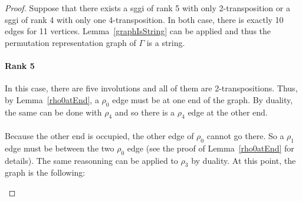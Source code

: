 \begin{proof}
  Suppose that there exists a sggi of rank 5 with only 2-transposition or a sggi of rank 4 with only one 4-transposition. In both case, there is exactly 10 edges for 11 vertices. Lemma~\ref{graphIsString} can be applied and thus the permutation representation graph of $\Gamma$ is a string.

  \paragraph{Rank 5}
  In this case, there are five involutions and all of them are 2-transpositions. Thus, by Lemma~\ref{rho0atEnd}, a $\rho_0$ edge must be at one end of the graph. By duality, the same can be done with $\rho_4$ and so there is a $\rho_4$ edge at the other end.

  \paragraph{}
  Because the other end is occupied, the other edge of $\rho_0$ cannot go there. So a $\rho_1$ edge must be between the two $\rho_0$ edge (see the proof of Lemma~\ref{rho0atEnd} for details). The same reasonning can be applied to $\rho_3$ by duality. At this point, the graph is the following:

  \begin{figure}[H]
    \begin{center}
\end{center}
\end{figure}
\end{proof}
